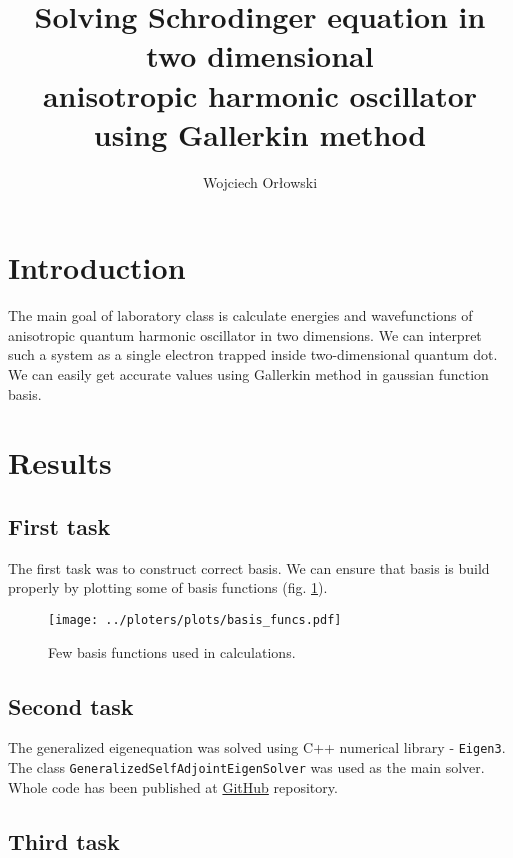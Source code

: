 \documentclass[a4paper, 12pt]{article}
\author{Wojciech Orłowski}
\title{Solving Schrodinger equation in two dimensional \\ anisotropic harmonic oscillator using Gallerkin method}
\begin{document}
\maketitle

\section*{Introduction}

The main goal of laboratory class is calculate energies and wavefunctions of anisotropic quantum harmonic oscillator in two dimensions.
We can interpret such a system as a single electron trapped inside two-dimensional quantum dot.
We can easily get accurate values using Gallerkin method in gaussian function basis.

\section*{Results}

\subsection*{First task}

The first task was to construct correct basis.
We can ensure that basis is build properly by plotting some of basis functions (fig. \ref{fig:basis}).

\begin{figure}[h]
    \begin{center}
        \texttt{[image: ../ploters/plots/basis\_funcs.pdf]}
    \end{center}
    \caption{Few basis functions used in calculations.}
    \label{fig:basis}
\end{figure}

\subsection*{Second task}

The generalized eigenequation was solved using C++ numerical library - \texttt{Eigen3}.
The class \texttt{GeneralizedSelfAdjointEigenSolver} was used as the main solver.
Whole code has been published at \href{https://github.com/OrlowskiWojtek/QuantumTransport}{GitHub} repository.

\subsection*{Third task}
\end{document}
